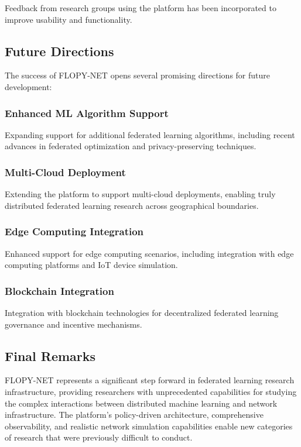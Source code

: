 Feedback from research groups using the platform has been incorporated to improve usability and functionality.

\subsection{Future Directions}

The success of FLOPY-NET opens several promising directions for future development:

\subsubsection{Enhanced ML Algorithm Support}

Expanding support for additional federated learning algorithms, including recent advances in federated optimization and privacy-preserving techniques.

\subsubsection{Multi-Cloud Deployment}

Extending the platform to support multi-cloud deployments, enabling truly distributed federated learning research across geographical boundaries.

\subsubsection{Edge Computing Integration}

Enhanced support for edge computing scenarios, including integration with edge computing platforms and IoT device simulation.

\subsubsection{Blockchain Integration}

Integration with blockchain technologies for decentralized federated learning governance and incentive mechanisms.

\subsection{Final Remarks}

FLOPY-NET represents a significant step forward in federated learning research infrastructure, providing researchers with unprecedented capabilities for studying the complex interactions between distributed machine learning and network infrastructure. The platform's policy-driven architecture, comprehensive observability, and realistic network simulation capabilities enable new categories of research that were previously difficult to conduct.

